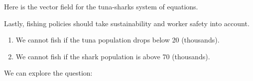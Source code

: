 \documentclass[../main.tex]{subfiles}
\begin{document}
\begin{example}
  Here is the vector field for the tuna-sharks system of equations.

  

  Lastly, fishing policies should take sustainability and worker safety into account.
  \begin{enumerate}
    \item We cannot fish if the tuna population drops below 20 (thousands).
    \item We cannot fish if the shark population is above 70 (thousands).
  \end{enumerate}

  We can explore the question: 
\end{example}
\end{document}
